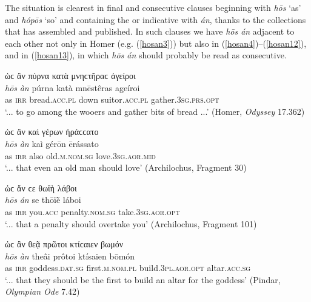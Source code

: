 The situation is clearest in final and consecutive clauses beginning with \emph{hōs} `as' and \emph{hópōs} `so' and containing the  or indicative with \emph{án}, thanks to the collections that \citet{Weber1884,Weber1885} has assembled and published. In such clauses we have \emph{hōs án} adjacent to each other not only in Homer (e.g. (\ref{hosan3})) but also in (\ref{hosan4})--(\ref{hosan12}), and in (\ref{hosan13}), in which \emph{hōs án} should probably be read as consecutive.

\begin{exe}
\ex ὡϲ ἂν πύρνα κατὰ μνηϲτῆραϲ ἀγείροι\\
\gll \emph{hōs} \emph{àn} púrna katà mnēstêras ageíroi\\
as \textsc{irr} bread.\textsc{acc.pl} down suitor.\textsc{acc.pl} gather.\textsc{3sg.prs.opt}\\
\trans `... to go among the wooers and gather bits of bread ...' (Homer, \textit{Odyssey} 17.362)
\label{hosan3}
\end{exe}

\begin{exe}
\ex ὡϲ ἂν καὶ γέρων ἠράϲϲατο\\
\gll \emph{hōs} \emph{àn} kaì gérōn ērássato\\
as \textsc{irr} also old.\textsc{m.nom.sg} love.\textsc{3sg.aor.mid}\\
\trans `... that even an old man should love' (Archilochus, Fragment 30)
\label{hosan4}
\end{exe}

\begin{exe}
\ex ὡϲ ἄν ϲε θωϊὴ λάβοι\\
\gll \emph{hōs} \emph{án} se thōïḕ láboi\\
as \textsc{irr} you.\textsc{acc} penalty.\textsc{nom.sg}
take.\textsc{3sg.aor.opt}\\
\trans `... that a penalty should overtake you' (Archilochus, Fragment 101)
\label{hosan5}
\end{exe}

\begin{exe}
\ex ὡϲ ἂν θεᾷ πρῶτοι κτίϲαιεν βωμόν\\
\gll \emph{hōs} \emph{àn} theâi prôtoi ktísaien bōmón\\
as \textsc{irr} goddess.\textsc{dat.sg} first.\textsc{m.nom.pl}
build.\textsc{3pl.aor.opt} altar.\textsc{acc.sg}\\
\trans `... that they should be the first to build an altar for the goddess' (Pindar, \textit{Olympian Ode} 7.42)
\label{hosan6}
\end{exe}

